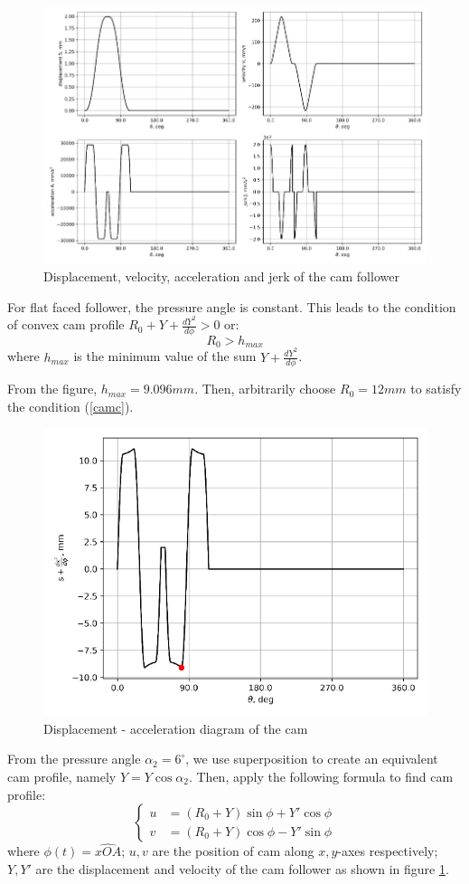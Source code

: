 \begin{figure}[h]
	\centering
	\includegraphics[width=0.8\linewidth]{24}
	\caption{Displacement, velocity, acceleration and jerk of the cam follower}
	\label{fig:24}
\end{figure}

For flat faced follower, the pressure angle is constant. This leads to the condition of convex cam profile $ R_0+Y+\frac{dY^2}{d\phi}>0 $ or:
\begin{equation}\label{camc}
	R_0> h_{max}
\end{equation}
where $ h_{max} $ is the minimum value of the sum $ Y+\frac{dY^2}{d\phi} $.

From the figure, $ h_{max}=9.096\unit{mm} $. Then, arbitrarily choose $ R_0=12\unit{mm} $ to satisfy the condition (\ref{camc}).
\begin{figure}[h]
	\centering
	\includegraphics[width=0.7\linewidth]{25}
	\caption{Displacement - acceleration diagram of the cam}
	\label{fig:25}
\end{figure}

From the pressure angle $ \alpha_2=6^\circ $, we use superposition to create an equivalent cam profile, namely $ Y=Y\cos\alpha_2 $. Then, apply the following formula to find cam profile:
\begin{equation}
\left\{
\begin{array}{ll}
u&=(R_0+Y)\sin\phi + Y'\cos\phi\\
v&=(R_0+Y)\cos\phi - Y'\sin\phi
\end{array}
\right.
\end{equation}
where $ \phi(t) =\widehat{xOA}$; $ u,v $ are the position of cam along $ x,y $-axes respectively; $ Y,Y' $ are the displacement and velocity of the cam follower as shown in figure \ref{fig:24}.

